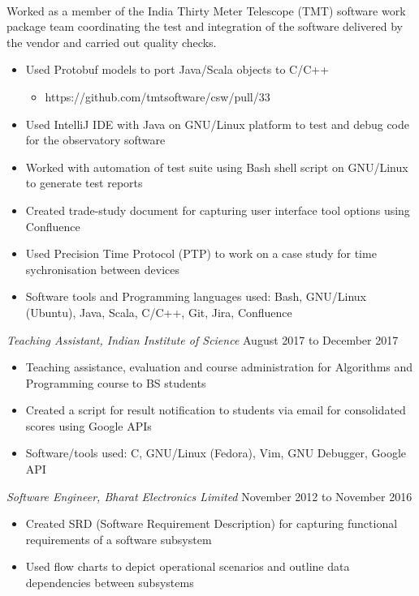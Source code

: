 \documentclass[line, margin]{res}
\begin{document}
\begin{resume}
  \\Worked as a member of the India Thirty Meter Telescope (TMT)
    software work package team coordinating the test and integration
    of the software delivered by the vendor and carried out quality
    checks.\\
  \begin{itemize}
  \item Used Protobuf models to port Java/Scala objects to C/C++
    \begin{itemize}
    \item https://github.com/tmtsoftware/csw/pull/33
      \end{itemize}
  \item Used IntelliJ IDE with Java on GNU/Linux platform to test and debug code for the observatory software
  \item Worked with automation of test suite using Bash shell script on GNU/Linux to generate test reports
  \item Created trade-study document for capturing user interface tool
    options using Confluence
  \item Used Precision Time Protocol (PTP) to work on a case study for time sychronisation between devices
  \item Software tools and Programming languages used: Bash, GNU/Linux (Ubuntu), Java, Scala, C/C++, Git, Jira, Confluence
  \end{itemize}
  \textit{Teaching Assistant, Indian Institute of Science} \hfill August 2017 to December 2017 \\
  \begin{itemize}
  \item Teaching assistance, evaluation and course administration for Algorithms and Programming course to BS students
  \item Created a script for result notification to students via email for consolidated scores using Google APIs
  \item Software/tools used: C, GNU/Linux (Fedora), Vim, GNU Debugger, Google API
  \end{itemize}
  \textit{Software Engineer, Bharat Electronics Limited} \hfill November 2012 to November 2016 \\
  \begin{itemize}
  \item Created SRD (Software Requirement Description) for capturing functional requirements of a software subsystem
  \item Used flow charts to depict operational scenarios and outline data dependencies between subsystems

\end{itemize}
\end{resume}
\end{document}
